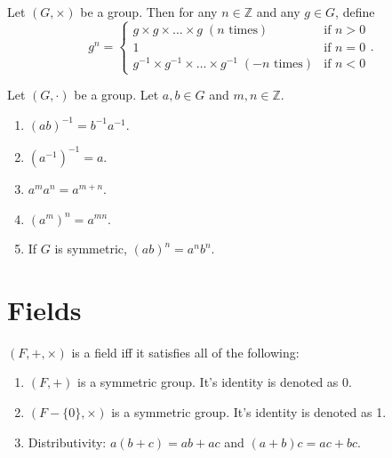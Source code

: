 \documentclass[a4paper, 12pt, fleqn]{article}
\begin{document}
\begin{definition}
Let $(G, \times)$ be a group. Then for any $n \in \mathbb{Z}$ and any $g \in G$, define
\[ g^n = \begin{cases}
g \times g \times \ldots \times g \; (n \textrm{ times}) & \textrm{if } n > 0
\\ 1 & \textrm{if } n = 0
\\ g^{-1} \times g^{-1} \times \ldots \times g^{-1} \; (-n \textrm{ times}) & \textrm{if } n < 0
\end{cases}. \]
\end{definition}

\begin{lemma}
Let $(G, \cdot)$ be a group. Let $a, b \in G$ and $m, n \in \mathbb{Z}$.
\begin{enumerate}
\item $(ab)^{-1} = b^{-1}a^{-1}$.
\item $(a^{-1})^{-1} = a$.
\item $a^ma^n = a^{m+n}$.
\item $(a^m)^n = a^{mn}$.
\item If $G$ is symmetric, $(ab)^n = a^nb^n$.
\end{enumerate}
\end{lemma}

\section{Fields}

\begin{definition}[Field]
$(F, +, \times)$ is a field iff it satisfies all of the following:
\begin{enumerate}
\item $(F, +)$ is a symmetric group. It's identity is denoted as 0.
\item $(F - \{0\}, \times)$ is a symmetric group. It's identity is denoted as 1.
\item Distributivity: $a(b + c) = ab + ac$ and $(a+b)c = ac + bc$.
\end{enumerate}
\end{definition}
\end{document}

